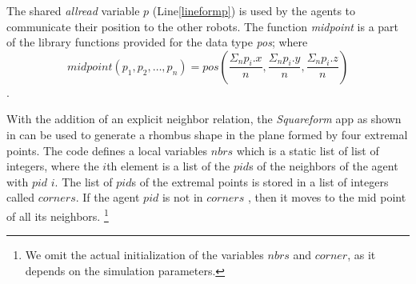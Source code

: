 %                  
%        

The shared \emph{allread} variable $p$ (Line\ref{lineformp}) is used by the agents to communicate their position to the other robots. The function \emph{midpoint} is a part of the library functions provided for the data type \emph{pos}; where $$\mathit{midpoint}(p_1,p_2,\ldots,p_n) = pos(\frac{\Sigma_n p_i.x}{n},\frac{\Sigma_n p_i.y}{n},\frac{\Sigma_n p_i.z}{n}) $$.


With the addition of an explicit neighbor relation, the \emph{Squareform} app as shown in  can be used to generate a rhombus shape in the plane formed by four extremal points. The code defines a local variables $nbrs$ which is a static list of list of integers, where the $i$th element is a list of the $\mathit{pid}$s of the neighbors of the agent with $\mathit{pid}$ $i$. The list of $\mathit{pid}$s of the extremal points is stored in a list of integers called $\mathit{corners}$. If the agent $\mathit{pid}$ is not in $\mathit{corners}$ , then it moves to the mid point of all its neighbors. \footnote{We omit the actual initialization of the variables $\mathit{nbrs}$ and $\mathit{corner}$, as it depends on the simulation parameters.}

